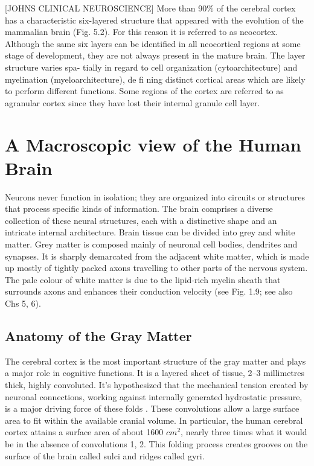 [JOHNS CLINICAL NEUROSCIENCE]
More than 90\% of the cerebral cortex has a characteristic six-layered structure that appeared with the evolution of the mammalian brain (Fig. 5.2).
For this reason it is referred to as neocortex.
Although the same six layers can be identified in all neocortical regions at some stage of development, they are not always present in the mature brain.
The layer structure varies spa- tially in regard to cell organization (cytoarchitecture) and myelination (myeloarchitecture), de fi ning distinct cortical areas which are likely to perform different functions.\cite{Waehnert2014, Bok1929}
Some regions of the cortex are referred to as agranular cortex since they have lost their internal granule cell layer.


\section{A Macroscopic view of the Human Brain}

Neurons never function in isolation; they are organized into circuits or structures that process specific kinds of information.
The brain comprises a diverse collection of these neural structures, each with a distinctive shape and an intricate internal architecture.
Brain tissue can be divided into grey and white matter.
Grey matter is composed mainly of neuronal cell bodies, dendrites and synapses.
It is sharply demarcated from the adjacent white matter, which is made up mostly of tightly packed axons travelling to other parts of the nervous system.
The pale colour of white matter is due to the lipid-rich myelin sheath that surrounds axons and enhances their conduction velocity (see Fig. 1.9; see also Chs 5, 6).

\subsection{Anatomy of the Gray Matter}

The cerebral cortex is the most important structure of the gray matter and plays a major role in cognitive functions.
It is a layered sheet of tissue, 2–3 millimetres thick, highly convoluted.
It's hypothesized that the mechanical tension created by neuronal connections, working against internally generated hydrostatic pressure, is a major driving force of these folds \cite{VanEssen1997}.
These convolutions allow a large surface area to fit within the available cranial volume.
In particular, the human cerebral cortex attains a surface area of about 1600 $cm^2$, nearly three times what it would be in the absence of convolutions 1, 2.
This folding process creates grooves on the surface of the brain called sulci and ridges called gyri.


